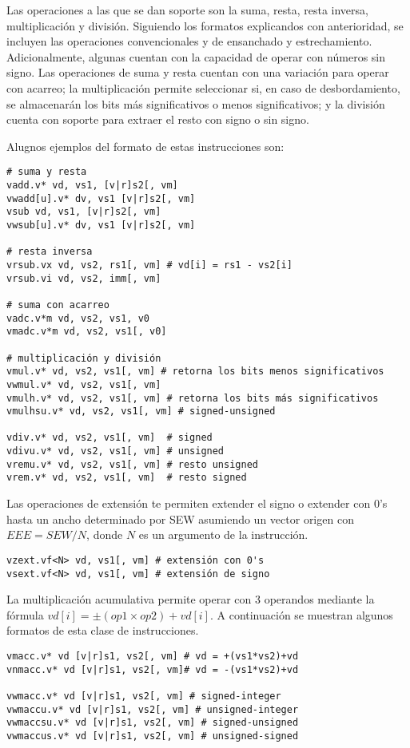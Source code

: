 Las operaciones a las que se dan soporte son la suma, resta, resta inversa,
multiplicación y división. Siguiendo los formatos explicandos con anterioridad,
se incluyen las operaciones convencionales y de ensanchado y estrechamiento.
Adicionalmente, algunas cuentan con la capacidad de operar con números sin
signo. Las operaciones de suma y resta cuentan con una variación para operar
con acarreo; la multiplicación permite seleccionar si, en caso de
desbordamiento, se almacenarán los bits más significativos o menos
significativos; y la división cuenta con soporte para extraer el resto con
signo o sin signo.

Alugnos ejemplos del formato de estas instrucciones son:

\begin{lstlisting}
# suma y resta
vadd.v* vd, vs1, [v|r]s2[, vm]
vwadd[u].v* dv, vs1 [v|r]s2[, vm]
vsub vd, vs1, [v|r]s2[, vm]
vwsub[u].v* dv, vs1 [v|r]s2[, vm]

# resta inversa
vrsub.vx vd, vs2, rs1[, vm] # vd[i] = rs1 - vs2[i]
vrsub.vi vd, vs2, imm[, vm]

# suma con acarreo
vadc.v*m vd, vs2, vs1, v0
vmadc.v*m vd, vs2, vs1[, v0]

# multiplicación y división
vmul.v* vd, vs2, vs1[, vm] # retorna los bits menos significativos
vwmul.v* vd, vs2, vs1[, vm]
vmulh.v* vd, vs2, vs1[, vm] # retorna los bits más significativos
vmulhsu.v* vd, vs2, vs1[, vm] # signed-unsigned

vdiv.v* vd, vs2, vs1[, vm]  # signed
vdivu.v* vd, vs2, vs1[, vm] # unsigned
vremu.v* vd, vs2, vs1[, vm] # resto unsigned
vrem.v* vd, vs2, vs1[, vm]  # resto signed

\end{lstlisting}

Las operaciones de extensión te permiten extender el signo o extender con 0's
hasta un ancho determinado por SEW asumiendo un vector origen con $EEE =
SEW/N$, donde $N$ es un argumento de la instrucción.

\begin{lstlisting}
vzext.vf<N> vd, vs1[, vm] # extensión con 0's
vsext.vf<N> vd, vs1[, vm] # extensión de signo
\end{lstlisting}

La multiplicación acumulativa permite operar con 3 operandos mediante la
fórmula $vd[i] = \pm(op1 \times op2) + vd[i]$. A continuación se muestran
algunos formatos de esta clase de instrucciones.

\begin{lstlisting}
vmacc.v* vd [v|r]s1, vs2[, vm] # vd = +(vs1*vs2)+vd
vnmacc.v* vd [v|r]s1, vs2[, vm]# vd = -(vs1*vs2)+vd

vwmacc.v* vd [v|r]s1, vs2[, vm] # signed-integer
vwmaccu.v* vd [v|r]s1, vs2[, vm] # unsigned-integer
vwmaccsu.v* vd [v|r]s1, vs2[, vm] # signed-unsigned
vwmaccus.v* vd [v|r]s1, vs2[, vm] # unsigned-signed
\end{lstlisting}

